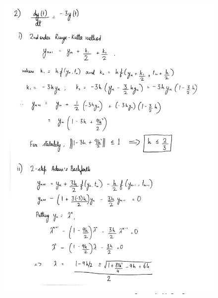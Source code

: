 \documentclass[12pt,letterpaper]{article}
\begin{document}
\begin{figure}[H]
\centering
\includegraphics[scale=0.55]{"../im1"}
\end{figure}
\end{document}
